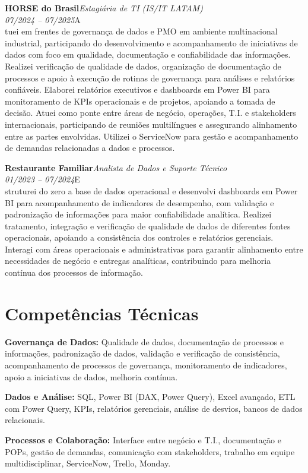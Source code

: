 \documentclass[11pt,a4paper]{article}
\newcommand{\cvrole}[4]{%
  \vspace{4pt}%
  {\bfseries\color{accentcolor}#1}\hfill{\itshape #2}\\[-2pt]%
  {\itshape #3}\hfill #4\\[6pt]%
}
\begin{document}
\cvrole{HORSE do Brasil}{Estagiária de TI (IS/IT LATAM)}{07/2024 -- 07/2025}

Atuei em frentes de governança de dados e PMO em ambiente multinacional industrial, participando do desenvolvimento e acompanhamento de iniciativas de dados com foco em qualidade, documentação e confiabilidade das informações. Realizei verificação de qualidade de dados, organização de documentação de processos e apoio à execução de rotinas de governança para análises e relatórios confiáveis. Elaborei relatórios executivos e dashboards em Power BI para monitoramento de KPIs operacionais e de projetos, apoiando a tomada de decisão. Atuei como ponte entre áreas de negócio, operações, T.I. e stakeholders internacionais, participando de reuniões multilíngues e assegurando alinhamento entre as partes envolvidas. Utilizei o ServiceNow para gestão e acompanhamento de demandas relacionadas a dados e processos.

\cvrole{Restaurante Familiar}{Analista de Dados e Suporte Técnico}{01/2023 -- 07/2024}

Estruturei do zero a base de dados operacional e desenvolvi dashboards em Power BI para acompanhamento de indicadores de desempenho, com validação e padronização de informações para maior confiabilidade analítica. Realizei tratamento, integração e verificação de qualidade de dados de diferentes fontes operacionais, apoiando a consistência dos controles e relatórios gerenciais. Interagi com áreas operacionais e administrativas para garantir alinhamento entre necessidades de negócio e entregas analíticas, contribuindo para melhoria contínua dos processos de informação.

\section{Competências Técnicas}

\textbf{Governança de Dados:} Qualidade de dados, documentação de processos e informações, padronização de dados, validação e verificação de consistência, acompanhamento de processos de governança, monitoramento de indicadores, apoio a iniciativas de dados, melhoria contínua.

\textbf{Dados e Análise:} SQL, Power BI (DAX, Power Query), Excel avançado, ETL com Power Query, KPIs, relatórios gerenciais, análise de desvios, bancos de dados relacionais.

\textbf{Processos e Colaboração:} Interface entre negócio e T.I., documentação e POPs, gestão de demandas, comunicação com stakeholders, trabalho em equipe multidisciplinar, ServiceNow, Trello, Monday.
\end{document}
